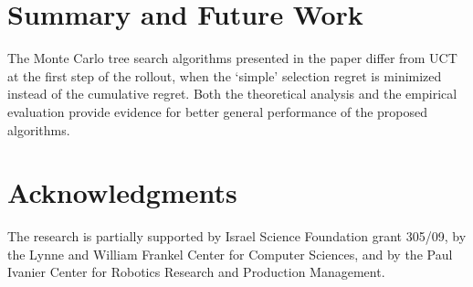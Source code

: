 \documentclass[letterpaper]{article}
\begin{document}
\section{Summary and Future Work}
\label{sec:summary}

The Monte Carlo tree search algorithms presented in the paper differ
from UCT at the first step of the rollout, when the `simple' selection
regret is minimized instead of the cumulative regret. Both the
theoretical analysis and the empirical evaluation provide evidence for
better general performance of the proposed algorithms.

\section*{Acknowledgments}

The research is partially supported by Israel
Science Foundation grant 305/09, by the Lynne and William Frankel
Center for Computer Sciences, and by the Paul Ivanier Center for
Robotics Research and Production Management.

\clearpage



\end{document}

